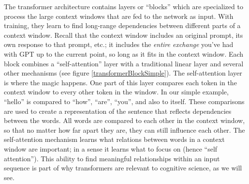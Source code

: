 The transformer architecture \cite{vaswani2017attention} contains layers or ``blocks'' which are specialized to process the large context windows that are fed to the network as input. With training, they learn to find long-range dependencies between different parts of a context window. Recall that the context window  includes an original prompt, its own response to that prompt, etc.; it includes the \emph{entire exchange} you've had with GPT up to the current point, so long as it fits in the context window. Each block combines a ``self-attention'' layer with a traditional linear layer and several other mechanisms (see figure \ref{transformerBlockSimple}). The self-attention layer is where the magic happens. One part of this layer compares each token in the context window to every other token in the window. In our simple example, ``hello'' is compared to ``how'', ``are'',  ``you'', and also to itself. These comparisons are used to create a representation of the sentence that reflects dependencies between the words. All words are compared to each other in the context window, so that no matter how far apart they are, they can still influence each other. The self-attention mechanism learns what relations between words in a context window are important; in a sense it learns what to focus on (hence ``self attention''). This ability to find meaningful relationships within an input sequence is part of why transformers are relevant to cognitive science, as we will see.

